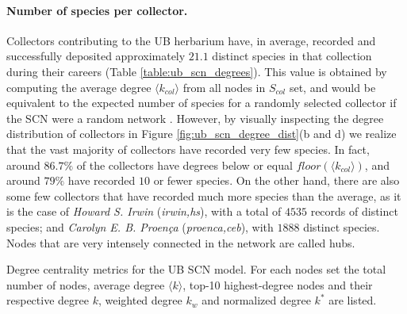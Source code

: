 \paragraph*{Number of species per collector.}
Collectors contributing to the UB herbarium have, in average, recorded and successfully deposited approximately $21.1$ distinct species in that collection during their careers (Table \ref{table:ub_scn_degrees}). This value is obtained by computing the average degree $\langle k_{col} \rangle$ from all nodes in $S_{col}$ set, and would be equivalent to the expected number of species for a randomly selected collector if the SCN were a random network \cite{Albert2002}.
However, by visually inspecting the degree distribution of collectors in Figure \ref{fig:ub_scn_degree_dist}(b and d) we realize that the vast majority of collectors have recorded very few species. In fact, around $86.7\%$ of the collectors have degrees below or equal $floor(\langle k_{col} \rangle)$, and around $79\%$ have recorded $10$ or fewer species.
On the other hand, there are also some few collectors that have recorded much more species than the average, as it is the case of \textit{Howard S. Irwin} (\textit{irwin,hs}), with a total of $4535$ records of distinct species; and \textit{Carolyn E. B. Proença} (\textit{proenca,ceb}), with $1888$ distinct species. Nodes that are very intensely connected in the network are called hubs.

\begin{table}[t]
\caption{ Degree centrality metrics for the UB SCN model. For each nodes set the total number of nodes, average degree $\langle k \rangle$, top-10 highest-degree nodes and their respective degree $k$, weighted degree $k_w$ and normalized degree $k^*$ are listed.}
\begin{center}
	
\end{center}
\label{table:ub_scn_degrees}
\end{table}

